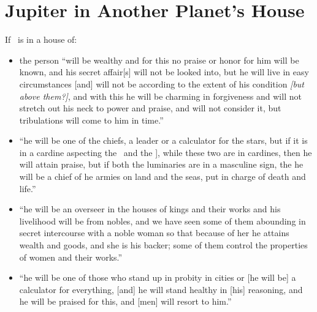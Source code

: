 \section{Jupiter in Another Planet's House}
If \Jupiter\, is in a house of:
\begin{itemize}[topsep=0em,itemsep=0em]
\item[\Saturn] the person ``will be wealthy and for this no praise or honor for him will be known, and his secret affair[s] will not be looked into, but he will live in easy circumstances [and] will not be according to the extent of his condition  \textsl{[but above them?]}, and with this he will be charming in forgiveness and will not stretch out his neck to power and praise, and will not consider it, but tribulations will come to him in time.''

\item[\Mars] ``he will be one of the chiefs, a leader or a calculator for the stars, but if it is in a cardine aspecting the \Moon\, and the \Sun], while these two are in cardines, then he will attain praise, but if both the luminaries are in a masculine sign, the he will be a chief of he armies on land and the seas, put in charge of death and life.''

\item[\Venus] ``he will be an overseer in the houses of kings and their works and his livelihood will be from nobles, and we have seen some of them abounding in secret intercourse with a noble woman so that because of her he attains wealth and goods, and she is his backer; some of them control the properties of women and their works.''

\item[\Mercury] ``he will be one of those who stand up in probity in cities or [he will be] a calculator for everything, [and] he will stand healthy in [his] reasoning, and he will be praised for this, and [men] will resort to him.''
\end{itemize}
